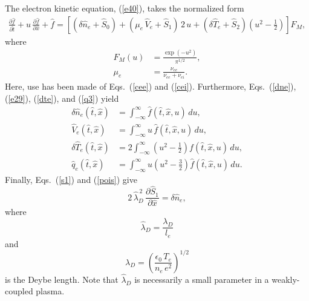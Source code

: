 \documentclass[12pt,prb,aps]{revtex4-1}
\begin{document}
The electron kinetic equation, (\ref{e40}), takes the normalized form
\begin{align}\label{e37a}
\frac{\partial\hat{f}}{\partial \hat{t}}+u\,\frac{\partial\hat{f}}{\partial\hat{x}} + \hat{f}
= \left[(\delta\hat{n}_e+\hat{S}_0)+(\mu_e\,\hat{V}_e+\hat{S}_1)\,2\,u+(\delta\hat{T}_e+\hat{S}_2)\left(u^2-\frac{1}{2}\right)\right] F_M,
\end{align}
where
\begin{align}
F_M(u) &=\frac{\exp(-u^2)}{\pi^{1/2}},\\[0.5ex]
\mu_e&= \frac{\nu_{ee}}{\nu_{ee}+\nu_{ei}}.
\end{align}
Here, use has been made of Eqs.~(\ref{cee}) and (\ref{cei}). Furthermore, Eqs.~(\ref{dne}), (\ref{e29}), (\ref{dte}), and (\ref{q3}) yield
\begin{align}\label{e28}
\delta\hat{n}_e(\hat{t},\hat{x})&=\int_{-\infty}^\infty \hat{f}(\hat{t},\hat{x},u)\,du,\\[0.5ex]
\hat{V}_e(\hat{t},\hat{x})&= \int_{-\infty}^\infty u\,\hat{f}(\hat{t},\hat{x},u)\,du,\\[0.5ex]
\delta\hat{T}_e(\hat{t},\hat{x})&= 2\int_{-\infty}^\infty \left(u^2-\frac{1}{2}\right)f(\hat{t},\hat{x},u)\,du,\label{e30}\\[0.5ex]
\hat{q}_e(\hat{t},\hat{x})&= \int_{-\infty}^\infty u\left(u^2-\frac{3}{2}\right)\hat{f}(\hat{t},\hat{x},u)\,du.
\end{align}
Finally, Eqs.~(\ref{s1}) and (\ref{pois}) give
\begin{equation}\label{e44a}
2\,\hat{\lambda}_D^{\,2}\,\frac{\partial\hat{S}_1}{\partial \hat{x}} = \delta\hat{n}_e,
\end{equation}
where
\begin{equation}
\hat{\lambda}_D = \frac{\lambda_D}{l_e}
\end{equation}
and
\begin{equation}
\lambda_D = \left(\frac{\epsilon_0\,T_e}{n_e\,e^2}\right)^{1/2}
\end{equation}
is the Deybe length.\cite{rf0} Note that $\hat{\lambda}_D$ is necessarily a small parameter in a weakly-coupled plasma.\cite{rf0}
\end{document}
